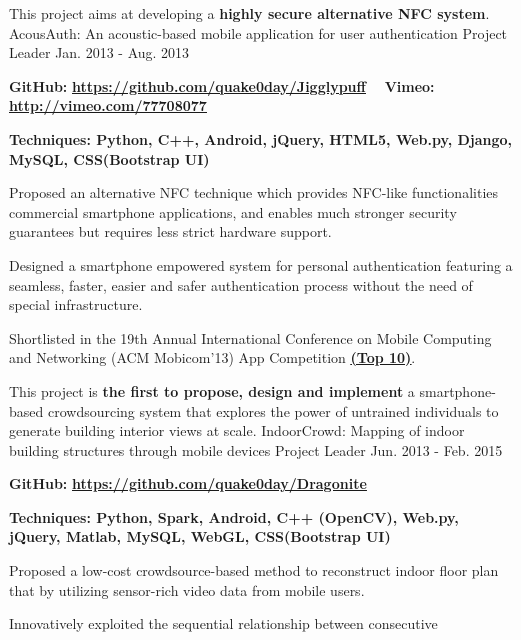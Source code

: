 \begin{cventries}
  \cventry
    {This project aims at developing a \textbf{highly secure alternative NFC system}.}
    {AcousAuth: An acoustic-based mobile application for user authentication}
    {Project Leader}
    {Jan. 2013 - Aug. 2013}
    {
      \begin{cvitems}
      \item \textbf{GitHub:} \href{https://github.com/quake0day/Jigglypuff}{\textbf{\underline{https://github.com/quake0day/Jigglypuff}}} \ \ \textbf{Vimeo:} \href{http://vimeo.com/77708077}{\textbf{\underline{http://vimeo.com/77708077}}}
      \item \textbf{Techniques: Python, C++, Android, jQuery, HTML5, Web.py, Django, MySQL, CSS(Bootstrap UI)} 
\item Proposed an alternative NFC technique which provides NFC-like functionalities commercial smartphone applications, and enables much stronger security guarantees but requires less strict hardware support. 
\item Designed a smartphone empowered system for personal authentication featuring
a seamless, faster, easier and safer authentication process without the need of special
infrastructure.
\item Shortlisted in the 19th Annual International Conference on Mobile Computing and Networking (ACM Mobicom'13) App Competition \href{http://www.sigmobile.org/mobicom/2013/app_finalists.html}{\textbf{\underline{(Top 10)}}}.
      \end{cvitems}
    }
  \cventry
    {This project is \textbf{the first to propose, design and implement} a smartphone-based crowdsourcing system that explores the power of untrained individuals to generate building interior views at scale.}
    {IndoorCrowd: Mapping of indoor building structures through mobile devices}
    {Project Leader}
    {Jun. 2013 - Feb. 2015}
    {
      \begin{cvitems}
            \item \textbf{GitHub:} \href{https://github.com/quake0day/Dragonite}{\textbf{\underline{https://github.com/quake0day/Dragonite}}}
      \item \textbf{Techniques: Python, Spark, Android, C++ (OpenCV), Web.py, jQuery, Matlab, MySQL, WebGL, CSS(Bootstrap UI)} 
\item Proposed a low-cost crowdsource-based method to reconstruct indoor floor plan that by utilizing sensor-rich video data from mobile users.
\item Innovatively exploited the sequential relationship between consecutive

\end{cvitems}}
\end{cventries}
